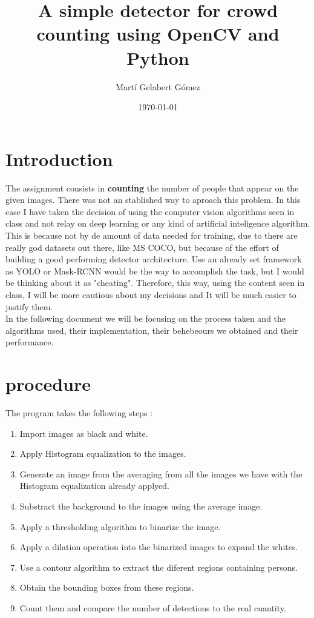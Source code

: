 \documentclass[11pt]{article}
\begin{document}
\title{A simple detector for crowd counting using OpenCV and Python}
\author{Martí Gelabert Gómez}
\date{\today}
\maketitle

\tableofcontents

\section{Introduction}
The assignment consists in \textbf{counting} the number of people that appear on the given images. There was not an stablished way to aproach this problem. In this case I have taken the decision of using the computer vision algorithms seen in class and not relay on deep learning or any kind of artificial inteligence algorithm. This is because not by de amount of data needed for training, due to there are really god datasets out there, like MS COCO, but because of the effort of building a good performing detector architecture. Use an already set framework as YOLO or Mask-RCNN would be the way to accomplish the task, but I would be thinking about it as "cheating". Therefore, this way, using the content seen in class, I will be more cautious about my decisions and It will be much easier to justify them.\\

In the following document  we will be focusing on the process taken and the algorithms used, their implementation, their behebeours we obtained and their performance.        

\section{procedure}
The program takes the following steps :

\begin{enumerate}
    \item Import images as black and white.
    \item Apply Histogram equalization to the images.
    \item Generate an image from the averaging from all the images we have with the Histogram equalization already applyed.
    \item Substract the background to the images using the average image.
    \item Apply a thresholding algorithm to binarize the image.
    \item Apply a dilation operation into the binarized images to expand the whites.
    \item Use a contour algorithm to extract the diferent regions containing persons.
    \item Obtain the bounding boxes from these regions.
    \item Count them and compare the number of detections to the real cuantity.
    \end{enumerate}
    
\end{document}
